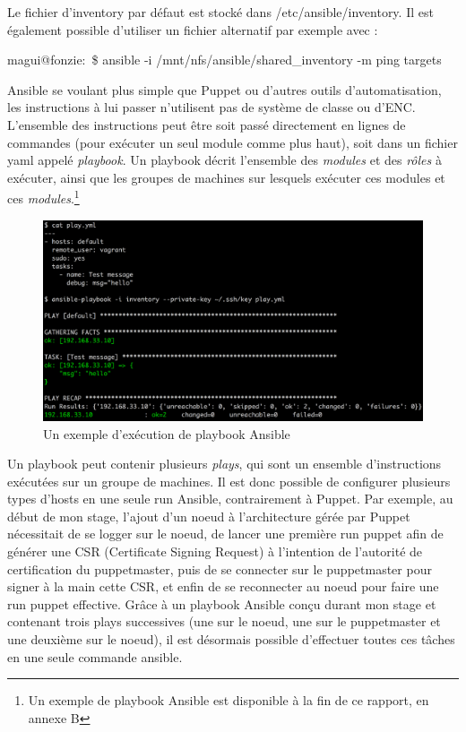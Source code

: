 \documentclass[14 pt,a4paper]{extreport}
\begin{document}
Le fichier d'inventory par défaut est stocké dans /etc/ansible/inventory. Il est également possible d'utiliser un fichier alternatif par exemple avec :

\begin{framed}magui@fonzie:~\$ ansible -i /mnt/nfs/ansible/shared\_inventory -m ping targets\end{framed}

Ansible se voulant plus simple que Puppet ou d'autres outils d'automatisation, les instructions à lui passer n'utilisent pas de système de classe ou d'ENC. L'ensemble des instructions peut être soit passé directement en lignes de commandes (pour exécuter un seul module comme plus haut), soit dans un fichier yaml appelé \emph{playbook}. Un playbook décrit l'ensemble des \emph{modules} et des \emph{rôles} à exécuter, ainsi que les groupes de machines sur lesquels exécuter ces modules et ces \emph{modules}.\footnote{Un exemple de playbook Ansible est disponible à la fin de ce rapport, en annexe B}

\begin{figure}[htp]
\centering
\includegraphics[scale=1.10]{play.png}
\caption{Un exemple d'exécution de playbook Ansible}
\label{}
\end{figure}

Un playbook peut contenir plusieurs \emph{plays}, qui sont un ensemble d'instructions exécutées sur un groupe de machines. Il est donc possible de configurer plusieurs types d'hosts en une seule run Ansible, contrairement à Puppet. Par exemple, au début de mon stage, l'ajout d'un noeud à l'architecture gérée par Puppet nécessitait de se logger sur le noeud, de lancer une première run puppet afin de générer une CSR (Certificate Signing Request) à l'intention de l'autorité de certification du puppetmaster, puis de se connecter sur le puppetmaster pour signer à la main cette CSR, et enfin de se reconnecter au noeud pour faire une run puppet effective. Grâce à un playbook Ansible conçu durant mon stage et contenant trois plays successives (une sur le noeud, une sur le puppetmaster et une deuxième sur le noeud), il est désormais possible d'effectuer toutes ces tâches en une seule commande ansible.
\end{document}
